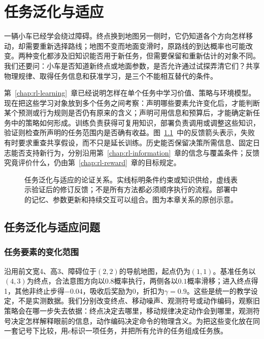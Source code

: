 \chapter{任务泛化与适应}
\label{chap:rl-transfer}

一辆小车已经学会绕过障碍。终点换到地图另一侧时，它仍知道各个方向怎样移动，却需要重新选择路线；地图不变而地面变滑时，原路线的到达概率也可能改变。两种变化都涉及旧知识能否用于新任务，但需要保留和重新估计的对象不同。我们还要问：小车是否知道新终点或地面参数，是否允许通过试探弄清它们？共享物理规律、取得任务信息和获准学习，是三个不能相互替代的条件。

第~\ref{chap:rl-learning}~章已经说明怎样在单个任务中学习价值、策略与环境模型。现在把这些学习对象放到多个任务之间考察：声明哪些要素允许变化后，才能判断某个预测或行为规则是否仍有原来的含义；声明可用信息和预算后，才能确定新任务中的策略如何形成。训练负责获得可复用知识，部署负责调用或调整这些知识，验证则检查所声明的任务范围内是否确有收益。图~\ref{fig:rl-transfer-map}~中的反馈箭头表示，失败有时要求重查共享假设，而不只是延长训练。历史能否保留决策所需信息、固定日志能否支持新行为，分别沿用第~\ref{chap:rl-information}~章的信念与覆盖条件；反馈究竟评价什么，仍由第~\ref{chap:rl-reward}~章的目标规定。

\begin{figure}[t]
  \centering
  
  \caption{任务泛化与适应的论证关系。实线标明条件约束或知识供给，虚线表示验证后的修订反馈；不是所有方法都必须顺序执行的流程。部署中的记忆、参数更新和持续交互可以组合。图为本章关系的原创示意。}
  \label{fig:rl-transfer-map}
\end{figure}

\section{任务泛化与适应问题}
\label{sec:rl-transfer-problem}

\subsection{任务要素的变化范围}
\label{sec:rl-transfer-components}

沿用前文宽4、高3、障碍位于$(2,2)$的导航地图，起点仍为$(1,1)$。基准任务以$(4,3)$为终点，合法意图方向以$0.8$概率执行，两侧各以$0.1$概率滑移；进入终点得1，其他非终止步得$-0.04$，吸收后奖励为0，折扣为$\gamma=0.9$。这些是统一的教学设定，不是实测数据。我们分别改变终点、移动噪声、观测符号或动作编码，观察旧策略会在哪一步失去依据：终点决定去哪里，移动规律决定动作会到哪里，观测符号决定怎样解释眼前的信息，动作编码决定命令的物理含义。为把这些变化放在同一套记号下比较，用$c$标识一项任务，并把所有允许的任务组成任务族。

